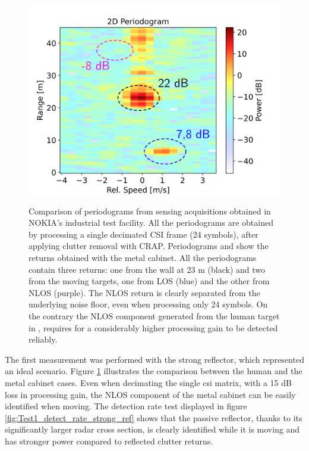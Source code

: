 \begin{figure}[H]
{		\includegraphics[scale=0.45]{Images/Test1/per_strong_ref/db_1frame_dec_CRAP_HUMAN_labelled_text22.png}
	}
	\caption[]{\small Comparison of periodograms from sensing acquisitions obtained in NOKIA's industrial test facility.
		All the periodograms are obtained by processing a single decimated CSI frame (24 symbols), after applying clutter removal with CRAP.
		Periodograms  and  show the returns obtained with the metal cabinet. All the periodograms contain three returns: one from the wall at 23 m (black) and two from the moving targets, one from LOS (blue) and the other from NLOS (purple). The NLOS return is clearly separated from the underlying noise floor, even when processing only 24 symbols. On the contrary the NLOS component generated from the human target in , requires for a considerably higher processing gain to be detected reliably.}
	\label{fig:Test1_metal-human_comparison}
	\end{figure}
The first measurement was performed with the strong reflector, which represented an ideal scenario. 
Figure \ref{fig:Test1_metal-human_comparison} illustrates the comparison between the human and the metal cabinet cases. 
Even when decimating the single \gls{csi} matrix, with a 15 dB loss in processing gain, the NLOS component of the metal cabinet can be easily identified when moving.
The detection rate test displayed in figure \ref{fig:Test1_detect_rate_strong_ref} shows that the passive reflector, thanks to its significantly larger radar cross section, is clearly identified while it is moving and has stronger power compared to reflected clutter returns.
